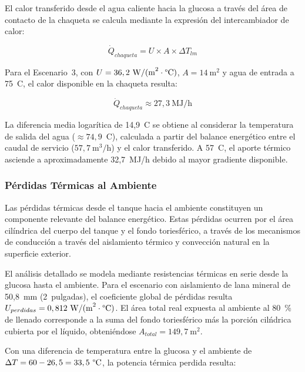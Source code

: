 El calor transferido desde el agua caliente hacia la glucosa a trav\'es del \'area de contacto de la chaqueta se calcula mediante la expresi\'on del intercambiador de calor:

\begin{equation}
\dot{Q}_{chaqueta} = U \times A \times \Delta T_{lm}
\label{eq:calor_chaqueta}
\end{equation}

Para el Escenario~3, con $U = 36,2~\text{W/(m}^{2}\cdot\text{\textdegree C)}$, $A = 14~\text{m}^{2}$ y agua de entrada a 75~\textdegree C, el calor disponible en la chaqueta resulta:

\begin{equation}
\boxed{\dot{Q}_{chaqueta} \approx 27,3~\text{MJ/h}}
\end{equation}

La diferencia media logar\'{i}tica de 14,9~\textdegree C se obtiene al considerar la temperatura de salida del agua ($\approx 74,9$~\textdegree C), calculada a partir del balance energ\'{e}tico entre el caudal de servicio ($57,7~\text{m}^{3}/\text{h}$) y el calor transferido. A 57~\textdegree C, el aporte t\'ermico asciende a aproximadamente 32,7~MJ/h debido al mayor gradiente disponible.

\subsubsection{P\'erdidas T\'ermicas al Ambiente}

Las p\'erdidas t\'ermicas desde el tanque hacia el ambiente constituyen un componente relevante del balance energ\'etico. Estas p\'erdidas ocurren por el \'area cil\'indrica del cuerpo del tanque y el fondo toriesf\'erico, a trav\'es de los mecanismos de conducci\'on a trav\'es del aislamiento t\'ermico y convecci\'on natural en la superficie exterior.

El an\'alisis detallado se modela mediante resistencias t\'ermicas en serie desde la glucosa hasta el ambiente. Para el escenario con aislamiento de lana mineral de 50,8~mm (2~pulgadas), el coeficiente global de p\'erdidas resulta $U_{perdidas} = 0,812~\text{W/(m}^{2}\cdot\text{\textdegree C)}$. El \'area total real expuesta al ambiente al 80~\% de llenado corresponde a la suma del fondo toriesf\'erico m\'as la porci\'on cil\'ndrica cubierta por el l\'iquido, obteni\'endose $A_{total} = 149,7~\text{m}^{2}$.

Con una diferencia de temperatura entre la glucosa y el ambiente de $\Delta T = 60 - 26,5 = 33,5~\text{\textdegree C}$, la potencia t\'ermica perdida resulta:

